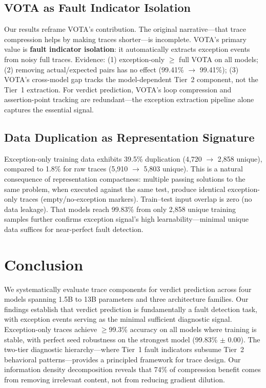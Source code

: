 \documentclass[11pt]{article}
\begin{document}
\subsection{VOTA as Fault Indicator Isolation}
\label{sec:vota_reposition}

Our results reframe VOTA's contribution.
The original narrative---that trace compression helps by making traces shorter---is incomplete.
VOTA's primary value is \textbf{fault indicator isolation}: it automatically extracts exception events from noisy full traces.
Evidence: (1) exception-only $\geq$ full VOTA on all models; (2) removing actual/expected pairs has no effect (99.41\% $\rightarrow$ 99.41\%); (3) VOTA's cross-model gap tracks the model-dependent Tier~2 component, not the Tier~1 extraction.
For verdict prediction, VOTA's loop compression and assertion-point tracking are redundant---the exception extraction pipeline alone captures the essential signal.

\subsection{Data Duplication as Representation Signature}
\label{sec:duplication}

Exception-only training data exhibits 39.5\% duplication (4{,}720 $\rightarrow$ 2{,}858 unique), compared to 1.8\% for raw traces (5{,}910 $\rightarrow$ 5{,}803 unique).
This is a natural consequence of representation compactness: multiple passing solutions to the same problem, when executed against the same test, produce identical exception-only traces (empty/no-exception markers).
Train--test input overlap is zero (no data leakage).
That models reach 99.83\% from only 2{,}858 unique training samples further confirms exception signal's high learnability---minimal unique data suffices for near-perfect fault detection.

\section{Conclusion}
\label{sec:conclusion}

We systematically evaluate trace components for verdict prediction across four models spanning 1.5B to 13B parameters and three architecture families.
Our findings establish that verdict prediction is fundamentally a fault detection task, with exception events serving as the minimal sufficient diagnostic signal.
Exception-only traces achieve $\geq$99.3\% accuracy on all models where training is stable, with perfect seed robustness on the strongest model (99.83\% $\pm$ 0.00).
The two-tier diagnostic hierarchy---where Tier~1 fault indicators subsume Tier~2 behavioral patterns---provides a principled framework for trace design.
Our information density decomposition reveals that 74\% of compression benefit comes from removing irrelevant content, not from reducing gradient dilution.
\end{document}
